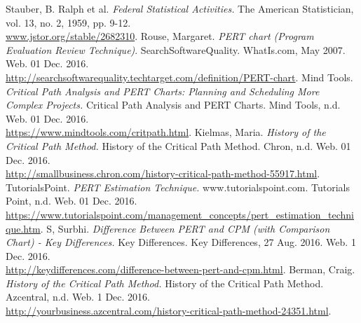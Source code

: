 \documentclass[12pt]{article}
\begin{document}
\newpage
\begin{thebibliography}{9}
  Stauber, B. Ralph et al.
  \textit{Federal Statistical Activities.}
  The American Statistician, vol. 13, no. 2, 1959, pp. 9-12. \\
  \url{www.jstor.org/stable/2682310}.
  Rouse, Margaret.
  \textit{PERT chart (Program Evaluation Review Technique)}.
  SearchSoftwareQuality. WhatIs.com, May 2007. Web. 01 Dec. 2016. \\
  \url{http://searchsoftwarequality.techtarget.com/definition/PERT-chart}.
  Mind Tools.
  \textit{Critical Path Analysis and PERT Charts: Planning and Scheduling More Complex Projects.}
  Critical Path Analysis and PERT Charts. Mind Tools, n.d. Web. 01 Dec. 2016. \\
  \url{https://www.mindtools.com/critpath.html}.
  Kielmas, Maria.
  \textit{History of the Critical Path Method.}
  History of the Critical Path Method. Chron, n.d. Web. 01 Dec. 2016. \\
  \url{http://smallbusiness.chron.com/history-critical-path-method-55917.html}.
  TutorialsPoint.
  \textit{PERT Estimation Technique.}
  www.tutorialspoint.com. Tutorials Point, n.d. Web. 01 Dec. 2016. \\
  \url{https://www.tutorialspoint.com/management_concepts/pert_estimation_technique.htm}.
  S, Surbhi. \textit{Difference Between PERT and CPM (with Comparison Chart) - Key Differences.} Key Differences.
  Key Differences, 27 Aug. 2016. Web. 1 Dec. 2016. \\
  \url{http://keydifferences.com/difference-between-pert-and-cpm.html}.
  Berman, Craig. \textit{History of the Critical Path Method.} History of the Critical Path Method. Azcentral, n.d. Web. 1 Dec. 2016. \\
  \url{http://yourbusiness.azcentral.com/history-critical-path-method-24351.html}.
\end{thebibliography}
\end{document}
